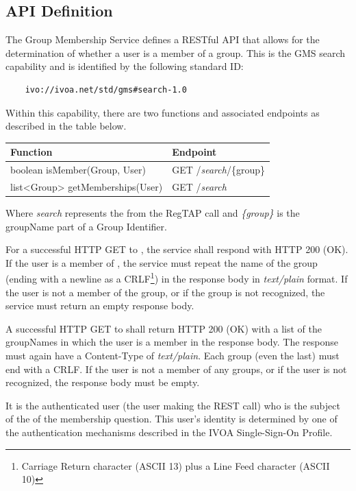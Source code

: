 \documentclass[11pt,a4paper]{ivoa}
\begin{document}
\subsection{API Definition}
\label{subsec:api}

The Group Membership Service defines a RESTful API \citep{fielding00} that allows for the determination of whether a user is a member of a group.  This is the GMS search capability and is identified by the following standard ID:

\begin{verbatim}
    ivo://ivoa.net/std/gms#search-1.0
\end{verbatim}

Within this capability, there are two functions and associated endpoints as described in the table below.

\vspace{3mm}
\begin{tabular}{l l}
\textbf{Function} & \textbf{Endpoint} \\
\hline
boolean isMember(Group, User) & GET /\emph{search}/\{group\} \\
list<Group> getMemberships(User) & GET /\emph{search} \\
\hline
\end{tabular}
\vspace{3mm}

Where \emph{search} represents the  from the RegTAP call and \emph{\{group\}} is the groupName part of a Group Identifier.

For a successful HTTP GET to , the service shall respond with HTTP 200 (OK).  If the user is a member of , the service must repeat the name of the group (ending with a newline as a CRLF\footnote{Carriage Return character (ASCII 13) plus a Line Feed character (ASCII 10)}) in the response body in \emph{text/plain} format.  If the user is not a member of the group, or if the group is not recognized, the service must return an empty response body.

A successful HTTP GET to  shall return HTTP 200 (OK) with a list of the groupNames in which the user is a member in the response body.  The response must again have a Content-Type of \emph {text/plain}.  Each group (even the last) must end with a CRLF.  If the user is not a member of any groups, or if the user is not recognized, the response body must be empty.

It is the authenticated user (the user making the REST call) who is the subject of the of the membership question.  This user's identity is determined by one of the authentication mechanisms described in the IVOA Single-Sign-On Profile.
\end{document}
